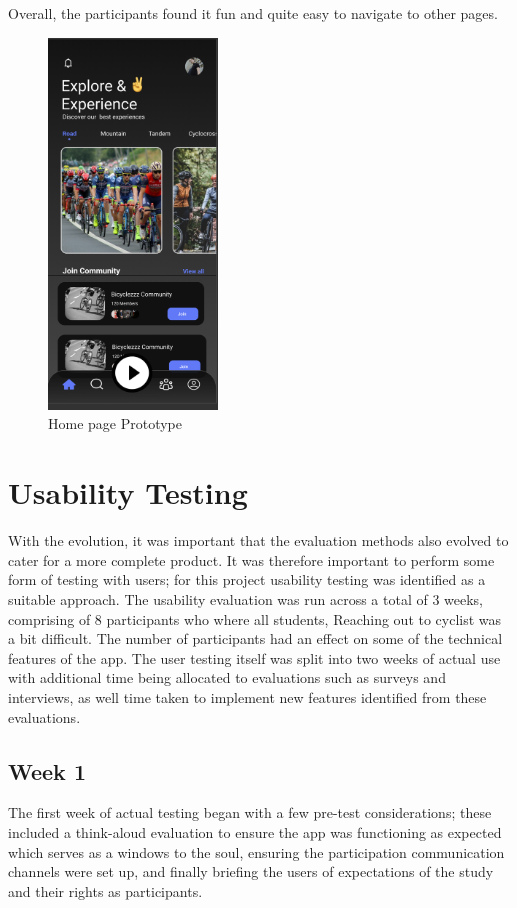\documentclass{l4proj}
\begin{document}
Overall, the participants found it fun and quite easy to navigate to other pages. 

\begin{figure}
    \centering
     \includegraphics[width=0.4\textwidth]{images/Profile.png}
     \caption{Home page Prototype}
    \label{fig:homepageprototype}
\end{figure}

\section{Usability Testing}
With the evolution, it was important that the evaluation methods also evolved to cater for a more complete product. It was therefore important to perform some form of testing with users; for this project usability testing was identified as a suitable approach. The usability evaluation was run across a total of 3 weeks, comprising of 8 participants who where all students, Reaching out to cyclist was a bit difficult. The number of participants had an effect on some of the technical features of the app. The user testing itself was split into two weeks of actual use with additional time being allocated to evaluations such as surveys and interviews, as well time taken to implement new features identified from these evaluations. 



\subsection{Week 1}\label{UsabilityTestingWeekOne}
The first week of actual testing began with a few pre-test considerations; these included a think-aloud evaluation to ensure the app was functioning as expected which serves as a windows to the soul, ensuring the participation communication channels were set up, and finally briefing the users of expectations of the study and their rights as participants. 
\end{document}
